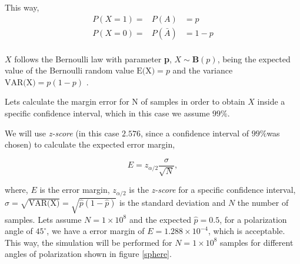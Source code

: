 This way,
\begin{eqnarray}
		P(X=1) =& P(A) & = p \nonumber\\
		P(X=0) =&P(\bar{A})&=1-p  \nonumber\\
\end{eqnarray}

$X$ follows the Bernoulli law with parameter \textbf{p}, $X \sim \mathbf{B}(p)$, being the expected value of the Bernoulli random value $\textrm{E(X)}=p$ and the variance $\textrm{VAR(X)}=p(1-p)$ \cite{probabilitySheldon}.

Lets calculate the margin error for N of samples in order to obtain $X$ inside a specific confidence interval, which in this case we assume $99\%$.

We will use \textit{z-score }(in this case $2.576$, since a confidence interval of $99\%$was chosen) to calculate the expected error margin,

\begin{equation}\label{eq:marginerror}
  E = z_{\alpha/2}\frac{\sigma}{\sqrt{N}},
  \nonumber
\end{equation}

where, $E$ is the error margin, $z_{\alpha/2}$ is the \textit{z-score} for a specific confidence interval, $\sigma = \sqrt{\textrm{VAR(X})} = \sqrt{\hat{p}(1-\hat{p})}$ is the standard deviation and $N$ the number of samples. Lets assume $N=1 \times 10^{8}$ and the expected $\hat{p} = 0.5$, for a polarization angle of $45^{\circ}$, we have a error margin of $E = 1.288 \times 10^{-4}$, which is acceptable. This way, the simulation will be performed for $N=1 \times 10^{8}$ samples for different angles of polarization shown in figure \ref{sphere}.

